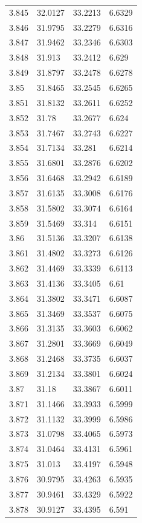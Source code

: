 \begin{tabular}{llll}
3.845 & 32.0127 & 33.2213 & 6.6329 \\
3.846 & 31.9795 & 33.2279 & 6.6316 \\
3.847 & 31.9462 & 33.2346 & 6.6303 \\
3.848 & 31.913 & 33.2412 & 6.629 \\
3.849 & 31.8797 & 33.2478 & 6.6278 \\
3.85 & 31.8465 & 33.2545 & 6.6265 \\
3.851 & 31.8132 & 33.2611 & 6.6252 \\
3.852 & 31.78 & 33.2677 & 6.624 \\
3.853 & 31.7467 & 33.2743 & 6.6227 \\
3.854 & 31.7134 & 33.281 & 6.6214 \\
3.855 & 31.6801 & 33.2876 & 6.6202 \\
3.856 & 31.6468 & 33.2942 & 6.6189 \\
3.857 & 31.6135 & 33.3008 & 6.6176 \\
3.858 & 31.5802 & 33.3074 & 6.6164 \\
3.859 & 31.5469 & 33.314 & 6.6151 \\
3.86 & 31.5136 & 33.3207 & 6.6138 \\
3.861 & 31.4802 & 33.3273 & 6.6126 \\
3.862 & 31.4469 & 33.3339 & 6.6113 \\
3.863 & 31.4136 & 33.3405 & 6.61 \\
3.864 & 31.3802 & 33.3471 & 6.6087 \\
3.865 & 31.3469 & 33.3537 & 6.6075 \\
3.866 & 31.3135 & 33.3603 & 6.6062 \\
3.867 & 31.2801 & 33.3669 & 6.6049 \\
3.868 & 31.2468 & 33.3735 & 6.6037 \\
3.869 & 31.2134 & 33.3801 & 6.6024 \\
3.87 & 31.18 & 33.3867 & 6.6011 \\
3.871 & 31.1466 & 33.3933 & 6.5999 \\
3.872 & 31.1132 & 33.3999 & 6.5986 \\
3.873 & 31.0798 & 33.4065 & 6.5973 \\
3.874 & 31.0464 & 33.4131 & 6.5961 \\
3.875 & 31.013 & 33.4197 & 6.5948 \\
3.876 & 30.9795 & 33.4263 & 6.5935 \\
3.877 & 30.9461 & 33.4329 & 6.5922 \\
3.878 & 30.9127 & 33.4395 & 6.591 \\

\end{tabular}
